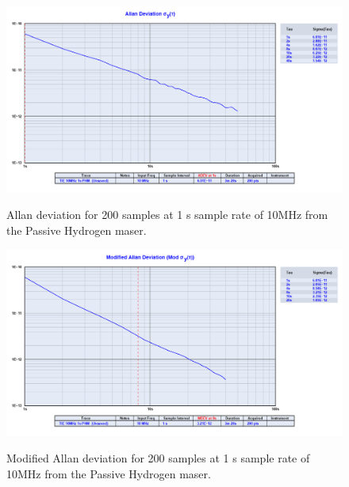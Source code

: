 \documentclass[11pt,english,a4paper]{article}
\begin{document}
\begin{figure}[]
  \caption{Allan deviation for 200 samples at 1 s sample rate of 10MHz from the Passive Hydrogen maser.}
  \centering
    \includegraphics[width=1\textwidth]{phm10mhz1s_allan.png}
    \label{fig:allan_dev1}
\end{figure}

\begin{figure}[]
  \caption{Modified Allan deviation for 200 samples at 1 s sample rate of 10MHz from the Passive Hydrogen maser.}
  \centering
    \includegraphics[width=1\textwidth]{phm10mhz1s_modified_allan.png}
    \label{fig:mod_allan_dev1}
\end{figure}

\newpage
\end{document}
